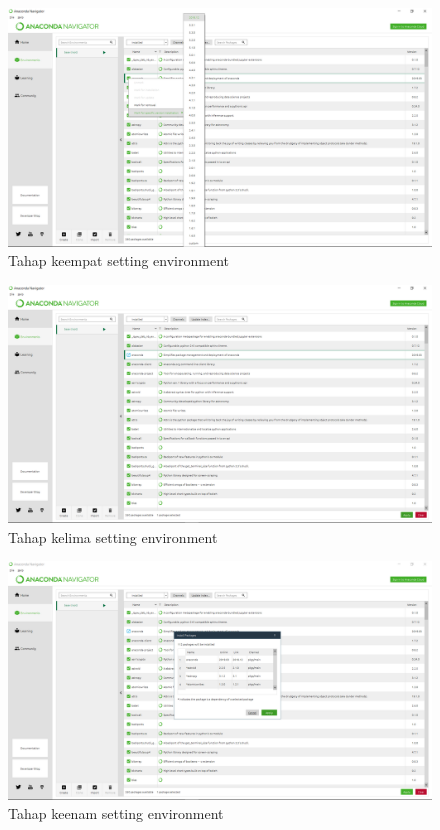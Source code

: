 \begin{enumerate}
\begin{itemize}
    \begin{figure} [!htbp]
    \centering
    \includegraphics[scale=0.2]{figures/A6.png}
    \caption{Tahap keempat setting environment}
\end{figure}

    \begin{figure} [!htbp]
    \centering
    \includegraphics[scale=0.2]{figures/A7.png}
    \caption{Tahap kelima setting environment}
\end{figure}

    \begin{figure} [!htbp]
    \centering
    \includegraphics[scale=0.2]{figures/A8.png}
    \caption{Tahap keenam setting environment}
\end{figure}
\end{itemize}


\end{enumerate}
